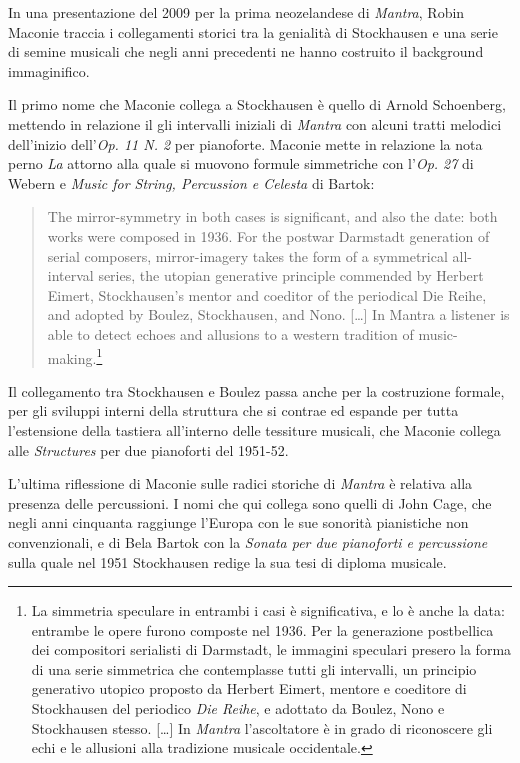 In una presentazione del 2009 per la prima neozelandese di \emph{Mantra}, Robin Maconie traccia i collegamenti storici tra la genialità di Stockhausen e una serie di semine musicali che negli anni precedenti ne hanno costruito il background immaginifico.

Il primo nome che Maconie collega a Stockhausen è quello di Arnold Schoenberg, mettendo in relazione il gli intervalli iniziali di \emph{Mantra} con alcuni tratti melodici dell'inizio dell'\emph{Op. 11 N. 2} per pianoforte. Maconie mette in relazione la nota perno \emph{La} attorno alla quale si muovono formule simmetriche con l'\emph{Op. 27} di Webern e \emph{Music for String, Percussion e Celesta} di Bartok:

\begin{quote} The mirror-symmetry in both cases is significant, and also the date: both works were composed in 1936. For the postwar Darmstadt generation of serial composers, mirror-imagery takes the form of a symmetrical all-interval series, the utopian generative principle commended by Herbert Eimert, Stockhausen's mentor and coeditor of the periodical Die Reihe, and adopted by Boulez, Stockhausen, and Nono. [\ldots] In Mantra a listener is able to detect echoes and allusions to a western tradition of music-making.\footnote{La simmetria speculare in entrambi i casi è significativa, e lo è anche la data: entrambe le opere furono composte nel 1936. Per la generazione postbellica dei compositori serialisti di Darmstadt, le immagini speculari presero la forma di una serie simmetrica che contemplasse tutti gli intervalli, un principio generativo utopico proposto da Herbert Eimert, mentore e coeditore di Stockhausen del periodico \emph{Die Reihe}, e adottato da Boulez, Nono e Stockhausen stesso. [\ldots] In \emph{Mantra} l'ascoltatore è in grado di riconoscere gli echi e le allusioni alla tradizione musicale occidentale.}
\end{quote}

Il collegamento tra Stockhausen e Boulez passa anche per la costruzione formale, per gli sviluppi interni della struttura che si contrae ed espande per tutta l'estensione della tastiera all'interno delle tessiture musicali, che Maconie collega alle \emph{Structures} per due pianoforti del 1951-52.

L'ultima riflessione di Maconie sulle radici storiche di \emph{Mantra} è relativa alla presenza delle percussioni. I nomi che qui collega sono quelli di John Cage, che negli anni cinquanta raggiunge l'Europa con le sue sonorità pianistiche non convenzionali, e di Bela Bartok con la \emph{Sonata per due pianoforti e percussione} sulla quale nel 1951 Stockhausen redige la sua tesi di diploma musicale.


